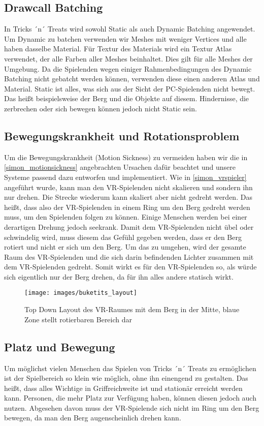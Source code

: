\subsection{Drawcall Batching}
In Tricks ´n´ Treats wird sowohl Static als auch Dynamic Batching angewendet. Um Dynamic zu batchen verwenden wir Meshes mit weniger Vertices und alle haben dasselbe Material. Für Textur des Materials wird ein Textur Atlas verwendet, der alle Farben aller Meshes beinhaltet. Dies gilt für alle Meshes der Umgebung. Da die Spielenden wegen einiger Rahmenbedingungen des Dynamic Batching nicht gebatcht werden können, verwenden diese einen anderen Atlas und Material. Static ist alles, was sich aus der Sicht der PC-Spielenden nicht bewegt. Das heißt beispielsweise der Berg und die Objekte auf diesem. Hindernisse, die zerbrechen oder sich bewegen können jedoch nicht Static sein.

\subsection{Bewegungskrankheit und Rotationsproblem}
Um die Bewegungskrankheit (Motion Sickness) zu vermeiden haben wir die in \ref{simon_motionsickness} angebrachten Ursachen dafür beachtet und unsere Systeme passend dazu entworfen und implementiert.
Wie in \ref{simon_vrspieler} angeführt wurde, kann man den VR-Spielenden nicht skalieren und sondern ihn nur drehen. Die Strecke wiederum kann skaliert aber nicht gedreht werden. Das heißt, dass also der VR-Spielenden in einem Ring um den Berg gedreht werden muss, um den Spielenden folgen zu können. Einige Menschen werden bei einer derartigen Drehung jedoch seekrank. Damit dem VR-Spielenden nicht übel oder schwindelig wird, muss diesem das Gefühl gegeben werden, dass er den Berg rotiert und nicht er sich um den Berg. Um das zu umgehen, wird der gesamte Raum des VR-Spielenden und die sich darin befindenden Lichter zusammen mit dem VR-Spielenden gedreht. Somit wirkt es für den VR-Spielenden so, als würde sich eigentlich nur der Berg drehen, da für ihn alles andere statisch wirkt.


\begin{figure}[h]
	\centering
	\texttt{[image: images/buketits\_layout]}
	\caption{Top Down Layout des VR-Raumes mit dem Berg in der Mitte, blaue Zone stellt rotierbaren Bereich dar}
\end{figure}



\subsection{Platz und Bewegung}
Um möglichst vielen Menschen das Spielen von Tricks ´n´ Treats zu ermöglichen ist der Spielbereich so klein wie möglich, ohne ihn einengend zu gestalten. Das heißt, dass alles Wichtige in Griffreichweite ist und stationär erreicht werden kann. Personen, die mehr Platz zur Verfügung haben, können diesen jedoch auch nutzen. Abgesehen davon muss der VR-Spielende sich nicht im Ring um den Berg bewegen, da man den Berg augenscheinlich drehen kann.

